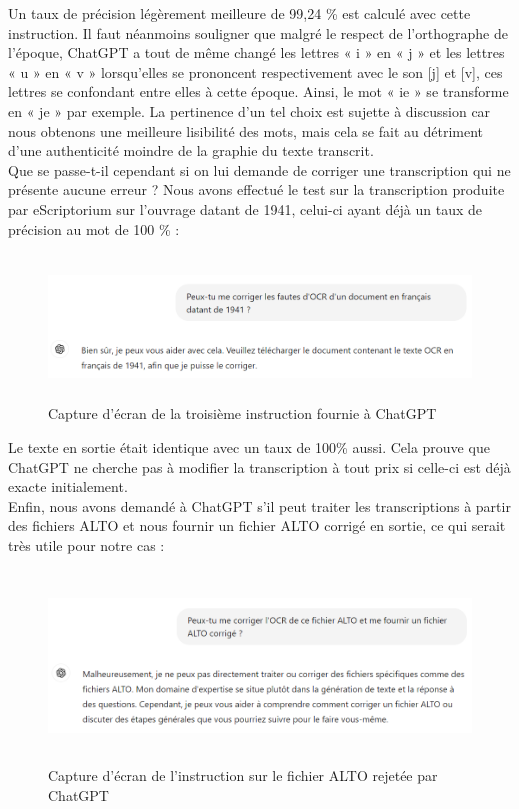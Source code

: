 \documentclass[a4paper,12pt,twoside]{book}
\begin{document}
Un taux de précision légèrement meilleure de 99,24 \% est calculé avec
cette instruction. Il faut néanmoins souligner que malgré le respect de
l'orthographe de l'époque, ChatGPT a tout de même changé les lettres « i
» en « j » et les lettres « u » en « v » lorsqu'elles se prononcent
respectivement avec le son {[}j{]} et {[}v{]}, ces lettres se confondant
entre elles à cette époque. Ainsi, le mot « ie » se transforme en « je »
par exemple. La pertinence d'un tel choix est sujette à discussion car
nous obtenons une meilleure lisibilité des mots, mais cela se fait au détriment d'une
authenticité moindre de la graphie du texte transcrit. \\

Que se passe-t-il cependant si on lui demande de corriger une
transcription qui ne présente aucune erreur ? Nous avons effectué le
test sur la transcription produite par eScriptorium sur l'ouvrage datant
de 1941, celui-ci ayant déjà un taux de précision au mot de 100 \% : \\

\begin{figure} [H]
	\includegraphics[width=6.26806in,height=1.52778in]{vertopal_157ae480aa4a4b07be198b586a812241/media/image18.png}
	\caption{Capture d'écran de la troisième instruction fournie à ChatGPT}
\end{figure}


Le texte en sortie était identique avec un taux de 100\% aussi. Cela
prouve que ChatGPT ne cherche pas à modifier la transcription à tout
prix si celle-ci est déjà exacte initialement. \\

Enfin, nous avons demandé à ChatGPT s'il peut traiter les transcriptions
à partir des fichiers ALTO et nous fournir un fichier ALTO corrigé en
sortie, ce qui serait très utile pour notre cas  : \\

\begin{figure} [H]
	\includegraphics[width=6.26806in,height=2in]{vertopal_157ae480aa4a4b07be198b586a812241/media/image19.png}
	\caption{Capture d'écran de l'instruction sur le fichier ALTO rejetée par ChatGPT}
\end{figure}
\end{document}
